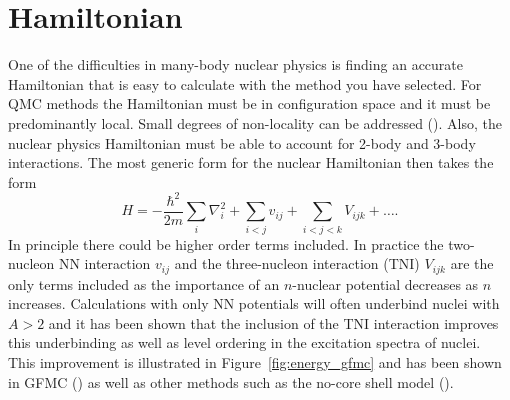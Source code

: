 \section{Hamiltonian}
One of the difficulties in many-body nuclear physics is finding an accurate Hamiltonian that is easy to calculate with the method you have selected. For QMC methods the Hamiltonian must be in configuration space and it must be predominantly local. Small degrees of non-locality can be addressed (\cite{lynn2012,lynn2013}). Also, the nuclear physics Hamiltonian must be able to account for 2-body and 3-body interactions. The most generic form for the nuclear Hamiltonian then takes the form
\begin{equation}
   H = -\frac{\hbar^2}{2m}\sum\limits_i \nabla_i^2 + \sum\limits_{i<j} v_{ij} + \sum\limits_{i<j<k} V_{ijk} + \ldots.
\end{equation}
In principle there could be higher order terms included. In practice the two-nucleon NN interaction $v_{ij}$ and the three-nucleon interaction (TNI) $V_{ijk}$ are the only terms included as the importance of an $n$-nuclear potential decreases as $n$ increases. Calculations with only NN potentials will often underbind nuclei with $A>2$ and it has been shown that the inclusion of the TNI interaction improves this underbinding as well as level ordering in the excitation spectra of nuclei. This improvement is illustrated in Figure~\ref{fig:energy_gfmc} and has been shown in GFMC (\cite{fantoni2008}) as well as other methods such as the no-core shell model (\cite{navratil2003}).

